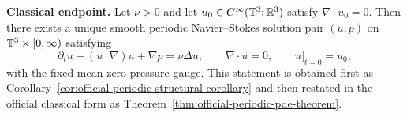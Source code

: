 \maketitle

\begin{tcolorbox}[title={Main endpoint theorem (Fefferman (B), periodic case)}, colback=blue!2!white, colframe=blue!55!black]
\textbf{Classical endpoint.}
Let $\nu>0$ and let $u_0\in C^\infty(\mathbb{T}^3;\mathbb{R}^3)$ satisfy $\nabla\cdot u_0=0$.
Then there exists a unique smooth periodic Navier--Stokes solution pair $(u,p)$ on
$\mathbb{T}^3\times[0,\infty)$ satisfying
\[
\partial_tu+(u\cdot\nabla)u+\nabla p=\nu\Delta u,
\qquad \nabla\cdot u=0,
\qquad u|_{t=0}=u_0,
\]
with the fixed mean-zero pressure gauge. This statement is obtained first as
Corollary~\ref{cor:official-periodic-structural-corollary} and then restated in the official classical form as
Theorem~\ref{thm:official-periodic-pde-theorem}.
\end{tcolorbox}

